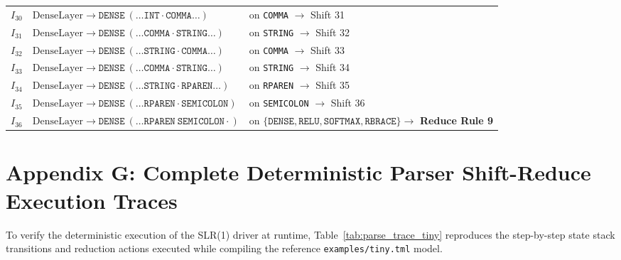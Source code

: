 \documentclass[11pt,a4paper]{article}
\begin{document}
\begin{table}[htbp]
\begin{tabular}{cp{6.5cm}p{5.5cm}}
$I_{30}$ & $\text{DenseLayer} \rightarrow \texttt{DENSE} \ (\dots \texttt{INT} \cdot \texttt{COMMA} \dots)$ & on \texttt{COMMA} $\rightarrow$ Shift 31 \\
$I_{31}$ & $\text{DenseLayer} \rightarrow \texttt{DENSE} \ (\dots \texttt{COMMA} \cdot \texttt{STRING} \dots)$ & on \texttt{STRING} $\rightarrow$ Shift 32 \\
$I_{32}$ & $\text{DenseLayer} \rightarrow \texttt{DENSE} \ (\dots \texttt{STRING} \cdot \texttt{COMMA} \dots)$ & on \texttt{COMMA} $\rightarrow$ Shift 33 \\
$I_{33}$ & $\text{DenseLayer} \rightarrow \texttt{DENSE} \ (\dots \texttt{COMMA} \cdot \texttt{STRING} \dots)$ & on \texttt{STRING} $\rightarrow$ Shift 34 \\
$I_{34}$ & $\text{DenseLayer} \rightarrow \texttt{DENSE} \ (\dots \texttt{STRING} \cdot \texttt{RPAREN} \dots)$ & on \texttt{RPAREN} $\rightarrow$ Shift 35 \\
$I_{35}$ & $\text{DenseLayer} \rightarrow \texttt{DENSE} \ (\dots \texttt{RPAREN} \cdot \texttt{SEMICOLON})$ & on \texttt{SEMICOLON} $\rightarrow$ Shift 36 \\
$I_{36}$ & $\text{DenseLayer} \rightarrow \texttt{DENSE} \ (\dots \texttt{RPAREN} \ \texttt{SEMICOLON} \cdot)$ & on $\{\texttt{DENSE}, \texttt{RELU}, \texttt{SOFTMAX}, \texttt{RBRACE}\} \rightarrow$ \textbf{Reduce Rule 9} \\
\bottomrule
\end{tabular}
\end{table}


\newpage
\section{Appendix G: Complete Deterministic Parser Shift-Reduce Execution Traces}
\label{app:parser_traces}

To verify the deterministic execution of the SLR(1) driver at runtime, Table~\ref{tab:parse_trace_tiny} reproduces the step-by-step state stack transitions and reduction actions executed while compiling the reference \texttt{examples/tiny.tml} model.
\end{document}
